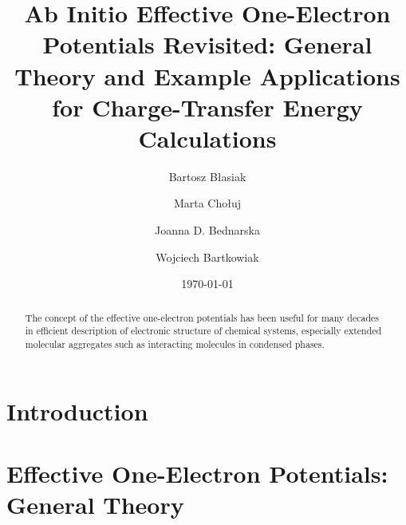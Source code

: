 


\title{Ab Initio Effective One-Electron Potentials Revisited:
General Theory and Example Applications for Charge-Transfer Energy Calculations}

\author{Bartosz B{\l}asiak}

\author{Marta Cho{\l}uj} 
\author{Joanna D. Bednarska}
\author{Wojciech Bartkowiak}


\date{\today}

\begin{abstract}
The concept of the effective one-electron potentials has been useful for many decades
in efficient description of electronic structure of chemical systems, especially extended
molecular aggregates such as interacting molecules in condensed phases. 
\end{abstract}

\pacs{}

\maketitle

\tableofcontents

\section{\label{s:1}Introduction}

\section{\label{s:2}Effective One-Electron Potentials: General Theory}

